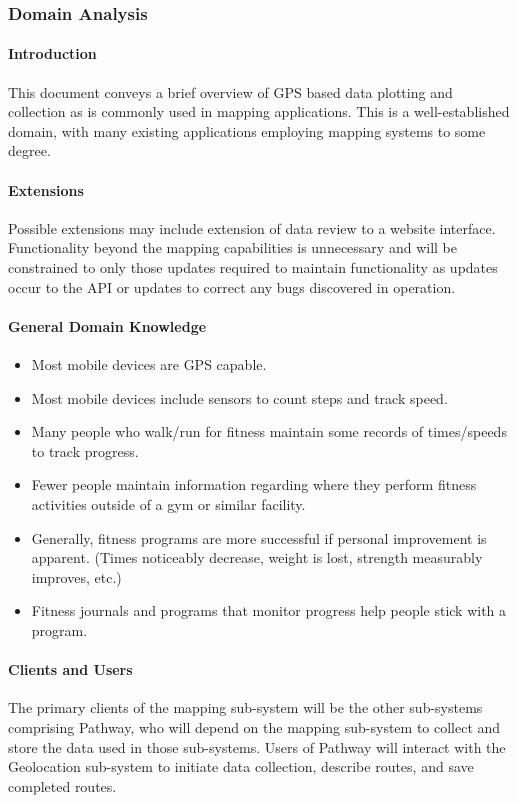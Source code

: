 \documentclass{article}
\begin{document}
\subsubsection{Domain Analysis}
\paragraph{Introduction}
This document conveys a brief overview of GPS based data plotting and collection as is commonly used in mapping applications. This is a well-established domain, with many existing applications employing mapping systems to some degree.

\paragraph{Extensions}
Possible extensions may include extension of data review to a website interface. Functionality beyond the mapping capabilities is unnecessary and will be constrained to only those updates required to maintain functionality as updates occur to the API or updates to correct any bugs discovered in operation.

\paragraph{General Domain Knowledge}
\begin{itemize}
    \item  Most mobile devices are GPS capable.
    \item Most mobile devices include sensors to count steps and track speed.
    \item Many people who walk/run for fitness maintain some records of times/speeds to track progress.
    \item Fewer people maintain information regarding where they perform fitness activities outside of a gym or similar facility.
    \item Generally, fitness programs are more successful if personal improvement is apparent. (Times noticeably decrease, weight is lost, strength measurably improves, etc.)
    \item Fitness journals and programs that monitor progress help people stick with a program.
\end{itemize}

\paragraph{Clients and Users}
The primary clients of the mapping sub-system will be the other sub-systems comprising Pathway, who will depend on the mapping sub-system to collect and store the data used in those sub-systems. Users of Pathway will interact with the Geolocation sub-system to initiate data collection, describe routes, and save completed routes.
\end{document}
